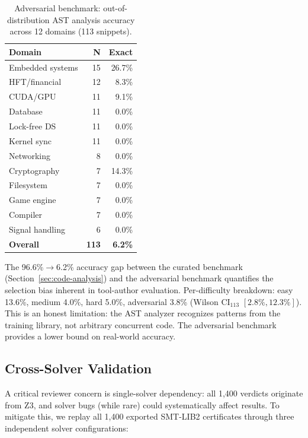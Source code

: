 \documentclass[11pt]{article}
\begin{document}
\begin{table}[ht]
\centering
\caption{Adversarial benchmark: out-of-distribution AST analysis accuracy
across 12 domains (113 snippets).}
\label{tab:adversarial}
\small
\begin{tabular}{lrr}
\toprule
\textbf{Domain} & \textbf{N} & \textbf{Exact} \\
\midrule
Embedded systems      & 15 & 26.7\% \\
HFT/financial         & 12 & 8.3\%  \\
CUDA/GPU              & 11 & 9.1\%  \\
Database              & 11 & 0.0\%  \\
Lock-free DS          & 11 & 0.0\%  \\
Kernel sync           & 11 & 0.0\%  \\
Networking            & 8  & 0.0\%  \\
Cryptography          & 7  & 14.3\% \\
Filesystem            & 7  & 0.0\%  \\
Game engine           & 7  & 0.0\%  \\
Compiler              & 7  & 0.0\%  \\
Signal handling       & 6  & 0.0\%  \\
\midrule
\textbf{Overall}      & \textbf{113} & \textbf{6.2\%} \\
\bottomrule
\end{tabular}
\end{table}

\noindent
The 96.6\%$\to$6.2\% accuracy gap between the curated benchmark
(Section~\ref{sec:code-analysis}) and the adversarial benchmark
quantifies the selection bias inherent in tool-author evaluation.
Per-difficulty breakdown: easy 13.6\%, medium 4.0\%, hard 5.0\%,
adversarial 3.8\% (Wilson CI$_{113}$ $[2.8\%, 12.3\%]$).
This is an honest limitation: the AST analyzer recognizes
patterns from the training library, not arbitrary concurrent code.
The adversarial benchmark provides a lower bound on real-world accuracy.

\subsection{Cross-Solver Validation}
\label{sec:cross-solver}

A critical reviewer concern is single-solver dependency: all
1{,}400 verdicts originate from Z3, and solver bugs (while rare)
could systematically affect results.  To mitigate this, we replay
all 1{,}400 exported SMT-LIB2 certificates through three independent
solver configurations:
\end{document}
